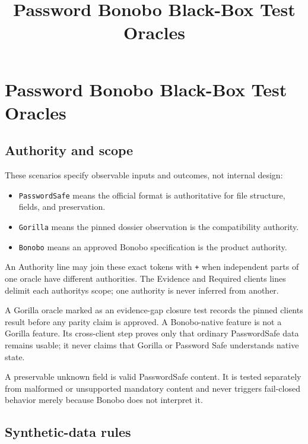 \documentclass[
  letterpaper,
]{article}
\title{Password Bonobo Black-Box Test Oracles}
\author{}
\date{}
\newcommand{\passthrough}[1]{#1}
\providecommand{\tightlist}{%
  \setlength{\itemsep}{0pt}\setlength{\parskip}{0pt}}
\begin{document}
\maketitle

{
\setcounter{tocdepth}{3}
\tableofcontents
}
\section{Password Bonobo Black-Box Test Oracles}\label{password-bonobo-black-box-test-oracles}

\subsection{Authority and scope}\label{authority-and-scope}

These scenarios specify observable inputs and outcomes, not internal design:

\begin{itemize}
\tightlist
\item
  \nolinkurl{PasswordSafe} means the official format is authoritative for file structure, fields, and preservation.
\item
  \passthrough{\lstinline!Gorilla!} means the pinned dossier observation is the compatibility authority.
\item
  \passthrough{\lstinline!Bonobo!} means an approved Bonobo specification is the product authority.
\end{itemize}

An Authority line may join these exact tokens with \passthrough{\lstinline!+!} when independent parts of one oracle have
different authorities. The Evidence and Required clients lines delimit each authority\textquotesingle s scope; one
authority is never inferred from another.

A Gorilla oracle marked as an evidence-gap closure test records the pinned client\textquotesingle s result before any
parity claim is approved. A Bonobo-native feature is not a Gorilla feature. Its cross-client step proves only that
ordinary PasswordSafe data remains usable; it never claims that Gorilla or Password Safe understands native state.

A preservable unknown field is valid PasswordSafe content. It is tested separately from malformed or unsupported
mandatory content and never triggers fail-closed behavior merely because Bonobo does not interpret it.

\subsection{Synthetic-data rules}\label{synthetic-data-rules}
\end{document}
